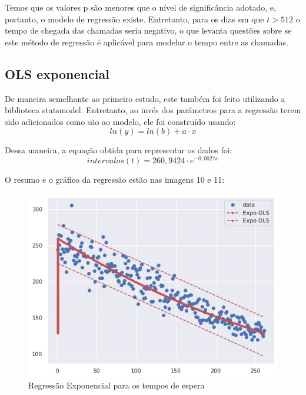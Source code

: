 Temos que os valores p são menores que o nível de significância adotado, e, portanto, o modelo de regressão existe. Entretanto, para os dias em que $t > 512$ o tempo de chegada das chamadas seria negativo, o que levanta questões sobre se este método de regressão é aplicável para modelar o tempo entre as chamadas.

\subsection{OLS exponencial}

De maneira semelhante ao primeiro estudo, este também foi feito utilizando a biblioteca statsmodel. Entretanto, ao invés dos parâmetros para a regressão terem sido adicionados como são ao modelo, ele foi construído usando: $$ln(y) = ln(b) + a \cdot x$$

Dessa maneira, a equação obtida para representar os dados foi:
$$intervalos(t) = 260,9424 \cdot e^{-0,0027x} $$

O resumo e o gráfico da regressão estão nas imagens 10 e 11:
\begin{figure}[H]
    \includegraphics{analise-de-dados/regressao/regressao_EXPO.png}
    \caption{Regressão Exponencial para os tempos de espera}
    \label{fig: plot_Expo_OLS}
\end{figure}

